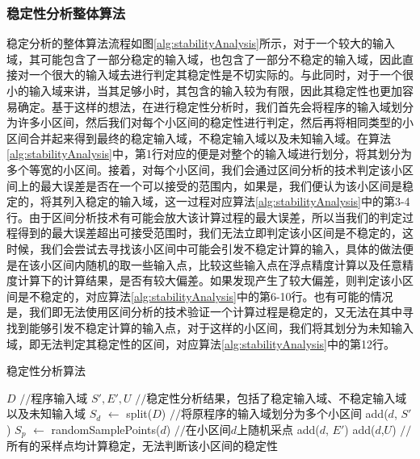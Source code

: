 \subsubsection{稳定性分析整体算法}

稳定分析的整体算法流程如图\ref{alg:stabilityAnalysis}所示，对于一个较大的输入域，其可能包含了一部分稳定的输入域，也包含了一部分不稳定的输入域，因此直接对一个很大的输入域去进行判定其稳定性是不切实际的。与此同时，对于一个很小的输入域来讲，当其足够小时，其包含的输入较为有限，因此其稳定性也更加容易确定。基于这样的想法，在进行稳定性分析时，我们首先会将程序的输入域划分为许多小区间，然后我们对每个小区间的稳定性进行判定，然后再将相同类型的小区间合并起来得到最终的稳定输入域，不稳定输入域以及未知输入域。在算法\ref{alg:stabilityAnalysis}中，第1行对应的便是对整个的输入域进行划分，将其划分为多个等宽的小区间。接着，对每个小区间，我们会通过区间分析的技术判定该小区间上的最大误差是否在一个可以接受的范围内，如果是，我们便认为该小区间是稳定的，将其列入稳定的输入域，这一过程对应算法\ref{alg:stabilityAnalysis}中的第3-4行。由于区间分析技术有可能会放大该计算过程的最大误差，所以当我们的判定过程得到的最大误差超出可接受范围时，我们无法立即判定该小区间是不稳定的，这时候，我们会尝试去寻找该小区间中可能会引发不稳定计算的输入，具体的做法便是在该小区间内随机的取一些输入点，比较这些输入点在浮点精度计算以及任意精度计算下的计算结果，是否有较大偏差。如果发现产生了较大偏差，则判定该小区间是不稳定的，对应算法\ref{alg:stabilityAnalysis}中的第6-10行。也有可能的情况是，我们即无法使用区间分析的技术验证一个计算过程是稳定的，又无法在其中寻找到能够引发不稳定计算的输入点，对于这样的小区间，我们将其划分为未知输入域，即无法判定其稳定性的区间，对应算法\ref{alg:stabilityAnalysis}中的第12行。
\begin{algorithm}[thb]
  \caption{稳定性分析算法}
  \label{alg:stabilityAnalysis}
\begin{algorithmic}[1]
\REQUIRE $D$ {{\footnotesize$//$}\small 程序输入域}
\ENSURE $S', E', U$ {{\footnotesize$//$}\small 稳定性分析结果，包括了稳定输入域、不稳定输入域以及未知输入域}
\STATE $S_d$ $\leftarrow$ split($D$) {{\footnotesize$//$}\small 将原程序的输入域划分为多个小区间}
\STATE add($d$, $S'$)
\ELSE
\STATE $S_p$ $\leftarrow$ randomSamplePoints($d$) {{\footnotesize$//$}\small 在小区间$d$上随机采点}
\STATE add($d$, $E'$)
\ENDIF
\ENDFOR
\STATE add($d$,$U$) {{\footnotesize$//$}\small 所有的采样点均计算稳定，无法判断该小区间的稳定性}
\ENDIF
\ENDFOR
\end{algorithmic}
\end{algorithm}

